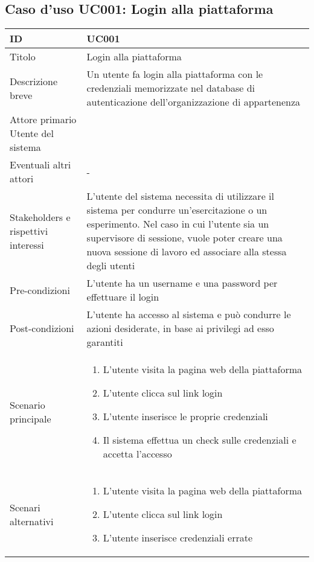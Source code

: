 \documentclass[../../main.tex]{subfiles}
\begin{document}
\subsection{Caso d’uso UC001: Login alla piattaforma }
\begin{tabularx}{150mm}{|l|X|}
    \hline
    ID                                  & \textbf{UC001}\\
    \hline
    Titolo                              & Login alla piattaforma \\
    \hline
    Descrizione breve                   & Un utente fa login alla piattaforma con le credenziali memorizzate nel database di autenticazione dell'organizzazione di appartenenza   \\
    \hline
    Attore primario                     Utente del sistema \\
    \hline
    Eventuali altri attori              & -   \\
    \hline
    Stakeholders e rispettivi interessi & L'utente del sistema necessita di utilizzare il sistema per condurre un'esercitazione o un esperimento. Nel caso in cui l'utente sia un supervisore di sessione, vuole poter creare una nuova sessione di lavoro ed associare alla stessa degli utenti   \\
    \hline
    Pre-condizioni                      & L'utente ha un username e una password per effettuare il login   \\
    \hline
    Post-condizioni                     & L'utente ha accesso al sistema e può condurre le azioni desiderate, in base ai privilegi ad esso garantiti   \\
    \hline
    Scenario principale                 & \begin {enumerate}
\item {L'utente visita la pagina web della piattaforma}
\item {L'utente clicca sul link login}
\item {L'utente inserisce le proprie credenziali}
\item {Il sistema effettua un check sulle credenziali e accetta l'accesso}
    \end{enumerate}
    \\
    \hline
    Scenari alternativi                 &
    \begin {enumerate}
\item{L'utente visita la pagina web della piattaforma}
\item{L'utente clicca sul link login}
\item{L'utente inserisce credenziali errate}

\end{enumerate}
\end{tabularx}
\end{document}
